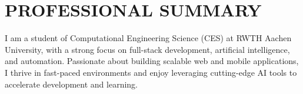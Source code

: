 \section{PROFESSIONAL SUMMARY}

\begin{onecolentry}
I am a student of Computational Engineering Science (CES) at RWTH Aachen University, with a strong focus on full-stack development, artificial intelligence, and automation. Passionate about building scalable web and mobile applications, I thrive in fast-paced environments and enjoy leveraging cutting-edge AI tools to accelerate development and learning.
\end{onecolentry}
